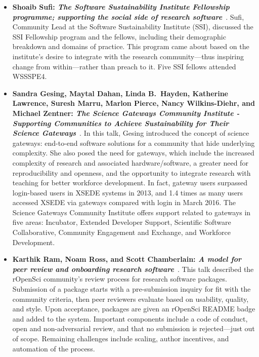\documentclass[11pt, oneside]{amsart}
\begin{document}
\begin{itemize}[itemsep=1ex]
    \item \textbf{Shoaib Sufi: \emph{The Software Sustainability Institute Fellowship
    programme; supporting the social side of research software}}~\cite{Sufi:2016ws}.
    Sufi, Community Lead at the Software Sustainability Institute (SSI), discussed
    the SSI Fellowship program and the fellows, including their
    demographic breakdown and domains of practice. This program came about
    based on the institute's desire to integrate with the research community---thus
    inspiring change from within---rather than preach to it. Five SSI fellows
    attended WSSSPE4.

    \item \textbf{Sandra Gesing, Maytal Dahan, Linda B.~Hayden, Katherine Lawrence,
    Suresh Marru, Marlon Pierce, Nancy Wilkins-Diehr, and Michael Zentner:
    \emph{The Science Gateways Community Institute - Supporting Communities to
    Achieve Sustainability for Their Science Gateways}}~\cite{Gesing:2016ws}.
    In this talk, Gesing introduced the concept of science gateways: end-to-end software
    solutions for a community that hide underlying complexity. She also posed the need
    for gateways, which include the increased complexity of research and associated
    hardware\slash software, a greater need for reproducibility and openness, and the
    opportunity to integrate research with teaching for better workforce development.
    In fact, gateway users surpassed login-based users in XSEDE systems in 2013,
    and 1.4 times as many users accessed XSEDE via gateways compared with
    login in March 2016. The Science Gateways Community Institute offers support
    related to gateways in five areas: Incubator, Extended Developer Support, Scientific
    Software Collaborative, Community Engagement and Exchange, and Workforce
    Development.

    \item \textbf{Karthik Ram\textsuperscript{\textasteriskcentered}, Noam Ross,
    and Scott Chamberlain: \emph{A model for
    peer review and onboarding research software}}~\cite{Ram:2016ws}.
    This talk described the rOpenSci community's review process for research
    software packages. Submission of a package starts with a pre-submission inquiry
    for fit with the community criteria, then peer reviewers evaluate based on
    usability, quality, and style. Upon acceptance, packages are given an rOpenSci
    README badge and added to the system. Important components include a code of
    conduct, open and non-adversarial review, and that no submission is
    rejected---just out of scope. Remaining challenges include scaling, author
    incentives, and automation of the process.


\end{itemize}
\end{document}
